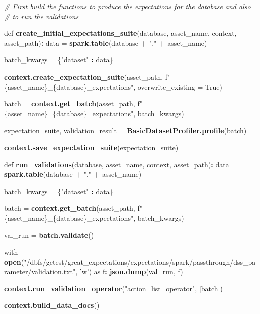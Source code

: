 \documentclass[]{article}
\newenvironment{Shaded}{\begin{snugshade}}{\end{snugshade}}
\newcommand{\CommentTok}[1]{\textcolor[rgb]{0.56,0.35,0.01}{\textit{#1}}}
\newcommand{\DataTypeTok}[1]{\textcolor[rgb]{0.13,0.29,0.53}{#1}}
\newcommand{\KeywordTok}[1]{\textcolor[rgb]{0.13,0.29,0.53}{\textbf{#1}}}
\newcommand{\NormalTok}[1]{#1}
\newcommand{\OperatorTok}[1]{\textcolor[rgb]{0.81,0.36,0.00}{\textbf{#1}}}
\newcommand{\StringTok}[1]{\textcolor[rgb]{0.31,0.60,0.02}{#1}}
\begin{document}
\begin{Shaded}
\begin{Highlighting}[]
\CommentTok{# First build the functions to produce the expectations for the database and also}
\CommentTok{# to run the validations }

\NormalTok{def }\KeywordTok{create_initial_expectations_suite}\NormalTok{(database, asset_name, context, asset_path)}\OperatorTok{:}
\StringTok{  }
\StringTok{  }\NormalTok{data =}\StringTok{ }\KeywordTok{spark.table}\NormalTok{(database }\OperatorTok{+}\StringTok{ "."} \OperatorTok{+}\StringTok{ }\NormalTok{asset_name)}
  
\NormalTok{  batch_kwargs =}\StringTok{ }\NormalTok{\{}\StringTok{"dataset"} \OperatorTok{:}\StringTok{ }\NormalTok{data\}}
  
  \KeywordTok{context.create_expectation_suite}\NormalTok{(asset_path, f}\StringTok{"\{asset_name\}_\{database\}_expectations"}\NormalTok{, }\DataTypeTok{overwrite_existing =}\NormalTok{ True)}
  
\NormalTok{  batch =}\StringTok{ }\KeywordTok{context.get_batch}\NormalTok{(asset_path, f}\StringTok{"\{asset_name\}_\{database\}_expectations"}\NormalTok{, batch_kwargs)}
  
\NormalTok{  expectation_suite, validation_result =}\StringTok{ }\KeywordTok{BasicDatasetProfiler.profile}\NormalTok{(batch)}
  
  \KeywordTok{context.save_expectation_suite}\NormalTok{(expectation_suite)}
  
  
\NormalTok{def }\KeywordTok{run_validations}\NormalTok{(database, asset_name, context, asset_path)}\OperatorTok{:}
\StringTok{  }
\StringTok{  }\NormalTok{data =}\StringTok{ }\KeywordTok{spark.table}\NormalTok{(database }\OperatorTok{+}\StringTok{ "."} \OperatorTok{+}\StringTok{ }\NormalTok{asset_name)}
  
\NormalTok{  batch_kwargs =}\StringTok{ }\NormalTok{\{}\StringTok{"dataset"} \OperatorTok{:}\StringTok{ }\NormalTok{data\}}
  
\NormalTok{  batch =}\StringTok{ }\KeywordTok{context.get_batch}\NormalTok{(asset_path, f}\StringTok{"\{asset_name\}_\{database\}_expectations"}\NormalTok{, batch_kwargs)}
  
\NormalTok{  val_run =}\StringTok{ }\KeywordTok{batch.validate}\NormalTok{()}
  
\NormalTok{  with }\KeywordTok{open}\NormalTok{(}\StringTok{"/dbfs/getest/great_expectations/expectations/spark/passthrough/dss_parameter/validation.txt"}\NormalTok{, }\StringTok{'w'}\NormalTok{) as f}\OperatorTok{:}
\StringTok{    }\KeywordTok{json.dump}\NormalTok{(val_run, f)}
  
  \KeywordTok{context.run_validation_operator}\NormalTok{(}\StringTok{"action_list_operator"}\NormalTok{, [batch])  }
  
  \KeywordTok{context.build_data_docs}\NormalTok{()}
\end{Highlighting}
\end{Shaded}
\end{document}
